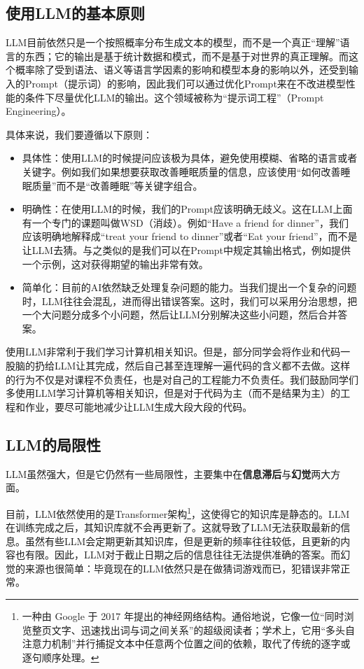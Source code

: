 \subsection{使用LLM的基本原则}

LLM目前依然只是一个按照概率分布生成文本的模型，而不是一个真正“理解”语言的东西；它的输出是基于统计数据和模式，而不是基于对世界的真正理解。而这个概率除了受到语法、语义等语言学因素的影响和模型本身的影响以外，还受到输入的Prompt（提示词）的影响，因此我们可以通过优化Prompt来在不改进模型性能的条件下尽量优化LLM的输出。这个领域被称为“提示词工程”（Prompt Engineering）。

具体来说，我们要遵循以下原则：

\begin{itemize}
  \item 具体性：使用LLM的时候提问应该极为具体，避免使用模糊、省略的语言或者关键字。例如我们如果想要获取改善睡眠质量的信息，应该使用“如何改善睡眠质量”而不是“改善睡眠”等关键字组合。
  \item 明确性：在使用LLM的时候，我们的Prompt应该明确无歧义。这在LLM上面有一个专门的课题叫做WSD（消歧）。例如“Have a friend for dinner”，我们应该明确地解释成“treat your friend to dinner”或者“Eat your friend”，而不是让LLM去猜。与之类似的是我们可以在Prompt中规定其输出格式，例如提供一个示例，这对获得期望的输出非常有效。
  \item 简单化：目前的AI依然缺乏处理复杂问题的能力。当我们提出一个复杂的问题时，LLM往往会混乱，进而得出错误答案。这时，我们可以采用分治思想，把一个大问题分成多个小问题，然后让LLM分别解决这些小问题，然后合并答案。
\end{itemize}

\begin{warning}
  使用LLM非常利于我们学习计算机相关知识。但是，部分同学会将作业和代码一股脑的扔给LLM让其完成，然后自己甚至连理解一遍代码的含义都不去做。这样的行为不仅是对课程不负责任，也是对自己的工程能力不负责任。我们鼓励同学们多使用LLM学习计算机等相关知识，但是对于代码为主（而不是结果为主）的工程和作业，要尽可能地减少让LLM生成大段大段的代码。
\end{warning}

\subsection{LLM的局限性}

LLM虽然强大，但是它仍然有一些局限性，主要集中在\textbf{信息滞后}与\textbf{幻觉}两大方面。

目前，LLM依然使用的是Transformer架构\footnote{一种由 Google 于 2017 年提出的神经网络结构。通俗地说，它像一位“同时浏览整页文字、迅速找出词与词之间关系”的超级阅读者；学术上，它用“多头自注意力机制”并行捕捉文本中任意两个位置之间的依赖，取代了传统的逐字或逐句顺序处理。}，这使得它的知识库是静态的。LLM在训练完成之后，其知识库就不会再更新了。这就导致了LLM无法获取最新的信息。虽然有些LLM会定期更新其知识库，但是更新的频率往往较低，且更新的内容也有限。因此，LLM对于截止日期之后的信息往往无法提供准确的答案。而幻觉的来源也很简单：毕竟现在的LLM依然只是在做猜词游戏而已，犯错误非常正常。

